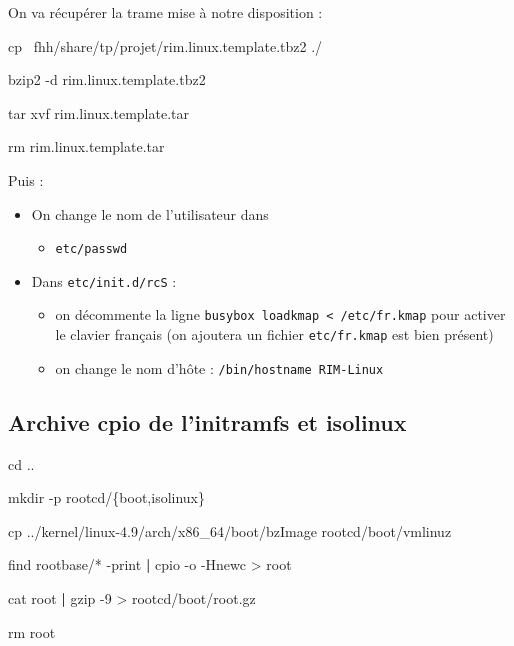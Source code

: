 \documentclass[]{article}
\newenvironment{Shaded}{}{}
\newcommand{\KeywordTok}[1]{\textcolor[rgb]{0.00,0.44,0.13}{\textbf{{#1}}}}
\newcommand{\DataTypeTok}[1]{\textcolor[rgb]{0.56,0.13,0.00}{{#1}}}
\newcommand{\FunctionTok}[1]{\textcolor[rgb]{0.02,0.16,0.49}{{#1}}}
\newcommand{\OperatorTok}[1]{\textcolor[rgb]{0.40,0.40,0.40}{{#1}}}
\newcommand{\BuiltInTok}[1]{{#1}}
\newcommand{\NormalTok}[1]{{#1}}
\providecommand{\tightlist}{%
  \setlength{\itemsep}{0pt}\setlength{\parskip}{0pt}}
\begin{document}
On va récupérer la trame mise à notre disposition :

\begin{Shaded}
\begin{Highlighting}[]
\FunctionTok{cp} \NormalTok{~fhh/share/tp/projet/rim.linux.template.tbz2 ./}

\FunctionTok{bzip2} \NormalTok{-d rim.linux.template.tbz2}

\FunctionTok{tar} \NormalTok{xvf rim.linux.template.tar}

\FunctionTok{rm} \NormalTok{rim.linux.template.tar}
\end{Highlighting}
\end{Shaded}

Puis :

\begin{itemize}
\item
  On change le nom de l'utilisateur dans

  \begin{itemize}
  \tightlist
  \item
    \texttt{etc/passwd}
  \end{itemize}
\item
  Dans \texttt{etc/init.d/rcS} :

  \begin{itemize}
  \tightlist
  \item
    on décommente la ligne
    \texttt{busybox\ loadkmap\ \textless{}\ /etc/fr.kmap} pour activer
    le clavier français (on ajoutera un fichier \texttt{etc/fr.kmap} est
    bien présent)
  \item
    on change le nom d'hôte : \texttt{/bin/hostname\ RIM-Linux}
  \end{itemize}
\end{itemize}

\subsection{Archive cpio de l'initramfs et
isolinux}\label{archive-cpio-de-linitramfs-et-isolinux}

\begin{Shaded}
\begin{Highlighting}[]

\BuiltInTok{cd} \NormalTok{..}

\FunctionTok{mkdir} \NormalTok{-p rootcd/}\DataTypeTok{\{boot,isolinux\}}

\FunctionTok{cp} \NormalTok{../kernel/linux-4.9/arch/x86_64/boot/bzImage rootcd/boot/vmlinuz}

\FunctionTok{find} \NormalTok{rootbase/* -print }\KeywordTok{|} \FunctionTok{cpio} \NormalTok{-o -Hnewc }\OperatorTok{>} \NormalTok{root}

\FunctionTok{cat} \NormalTok{root }\KeywordTok{|} \FunctionTok{gzip} \NormalTok{-9 }\OperatorTok{>} \NormalTok{rootcd/boot/root.gz}

\FunctionTok{rm} \NormalTok{root}
\end{Highlighting}
\end{Shaded}
\end{document}
